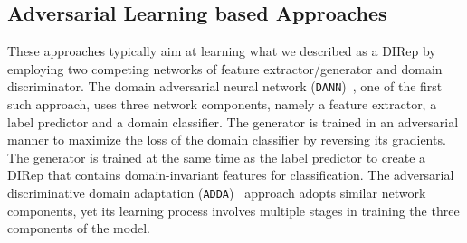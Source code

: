 \documentclass{article}
\newcommand\todo[1]{\textcolor{red}{#1}}
\begin{document}
\subsection{Adversarial Learning based Approaches} \label{adv}%
These approaches typically aim at learning what we described  as a DIRep by employing two competing networks of feature extractor/generator and domain discriminator. The domain adversarial neural network (\verb"DANN")~\cite{ganin2016domain},  one of the first such approach, uses three network components, namely a feature extractor, a label predictor and a domain classifier. %
The generator is trained in an adversarial manner to maximize the loss of the domain classifier by reversing its gradients. The generator is trained at the same time as the label predictor to create a DIRep that contains domain-invariant features for classification. 
The adversarial discriminative domain adaptation (\verb"ADDA")~\cite{tzeng2017adversarial} approach adopts similar network components, yet its learning process involves multiple stages in training the three components of the model.
\end{document}
